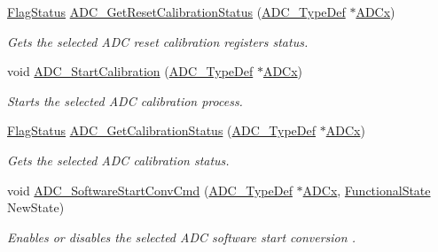 \begin{DoxyCompactItemize}
\mbox{\hyperlink{group___exported__types_ga89136caac2e14c55151f527ac02daaff}{Flag\+Status}} \mbox{\hyperlink{group___a_d_c___exported___functions_ga113be9fe25add8d7496bed659c68e02b}{A\+D\+C\+\_\+\+Get\+Reset\+Calibration\+Status}} (\mbox{\hyperlink{struct_a_d_c___type_def}{A\+D\+C\+\_\+\+Type\+Def}} $\ast$\mbox{\hyperlink{group___s_t_m32_f1_x_x___n_u_c_l_e_o___l_o_w___l_e_v_e_l___exported___constants_gab44c1065d38c298955fc028346984340}{A\+D\+Cx}})
\begin{DoxyCompactList}\small\item\em Gets the selected A\+DC reset calibration registers status. \end{DoxyCompactList}\item 
void \mbox{\hyperlink{group___a_d_c___exported___functions_gadcba6341124a6aabfd2dd885ca8e5f14}{A\+D\+C\+\_\+\+Start\+Calibration}} (\mbox{\hyperlink{struct_a_d_c___type_def}{A\+D\+C\+\_\+\+Type\+Def}} $\ast$\mbox{\hyperlink{group___s_t_m32_f1_x_x___n_u_c_l_e_o___l_o_w___l_e_v_e_l___exported___constants_gab44c1065d38c298955fc028346984340}{A\+D\+Cx}})
\begin{DoxyCompactList}\small\item\em Starts the selected A\+DC calibration process. \end{DoxyCompactList}\item 
\mbox{\hyperlink{group___exported__types_ga89136caac2e14c55151f527ac02daaff}{Flag\+Status}} \mbox{\hyperlink{group___a_d_c___exported___functions_ga7a728f699b487c7fa1694d7424967122}{A\+D\+C\+\_\+\+Get\+Calibration\+Status}} (\mbox{\hyperlink{struct_a_d_c___type_def}{A\+D\+C\+\_\+\+Type\+Def}} $\ast$\mbox{\hyperlink{group___s_t_m32_f1_x_x___n_u_c_l_e_o___l_o_w___l_e_v_e_l___exported___constants_gab44c1065d38c298955fc028346984340}{A\+D\+Cx}})
\begin{DoxyCompactList}\small\item\em Gets the selected A\+DC calibration status. \end{DoxyCompactList}\item 
void \mbox{\hyperlink{group___a_d_c___exported___functions_ga694130a8d1ad3c8877b7eddb29611b30}{A\+D\+C\+\_\+\+Software\+Start\+Conv\+Cmd}} (\mbox{\hyperlink{struct_a_d_c___type_def}{A\+D\+C\+\_\+\+Type\+Def}} $\ast$\mbox{\hyperlink{group___s_t_m32_f1_x_x___n_u_c_l_e_o___l_o_w___l_e_v_e_l___exported___constants_gab44c1065d38c298955fc028346984340}{A\+D\+Cx}}, \mbox{\hyperlink{group___exported__types_gac9a7e9a35d2513ec15c3b537aaa4fba1}{Functional\+State}} New\+State)
\begin{DoxyCompactList}\small\item\em Enables or disables the selected A\+DC software start conversion . \end{DoxyCompactList}\item 

\end{DoxyCompactItemize}
